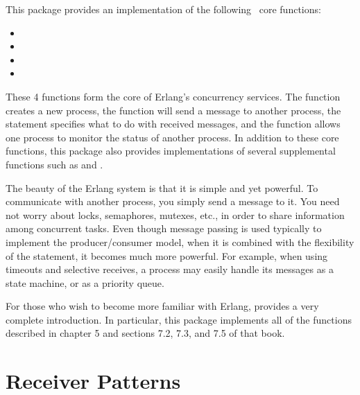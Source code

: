 \documentclass{howto}
\newcommand{\Erlang}{\ulink{Erlang}{http://www.erlang.org/}}
\begin{document}
This package provides an implementation of the following \Erlang\ core
functions:
\begin{itemize}
	\item {}
	\item {}
	\item {}
	\item {}
\end{itemize}

These 4 functions form the core of Erlang's concurrency services. The
 function creates a new process, the 
function will send a message to another process, the  statement
specifies what to do with received messages, and the  function
allows one process to monitor the status of another process. In addition to
these core functions, this package also provides implementations of several
supplemental functions such as  and .

The beauty of the Erlang system is that it is simple and yet powerful.
To communicate with another process, you simply send a message to it.
You need not worry about locks, semaphores, mutexes, etc., in order to
share information among concurrent tasks. Even though message passing is
used typically to implement the producer/consumer model, when it is combined
with the flexibility of the  statement, it becomes much more
powerful. For example, when using timeouts and selective receives, a process
may easily handle its messages as a state machine, or as a priority queue.

For those who wish to become more familiar with Erlang,
 provides a very complete introduction. In
particular, this package implements all of the functions described in chapter 5
and sections 7.2, 7.3, and 7.5 of that book.



\section{Receiver Patterns}
\label{patterns}

\newcommand{\addhandler}{\method{addHandler()}}
\end{document}
